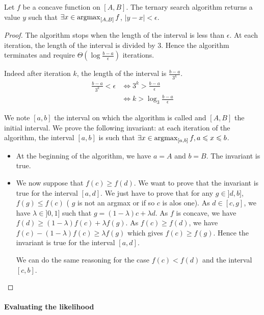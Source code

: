 \begin{thm}
    Let $f$ be a concave function on $[A, B]$. The ternary search algorithm returns a value $y$ such that $\exists x \in \operatorname*{argmax}_{[A, B]} f$, $|y - x| < \epsilon$.
\end{thm}
\begin{proof}
    The algorithm stops when the length of the interval is less than $\epsilon$. At each iteration, the length of the interval is divided by $3$. Hence the algorithm terminates and require $\Theta(\log \frac{b - a}{\epsilon})$ iterations.

    Indeed after iteration $k$, the length of the interval is $\frac{b - a}{3^k}$.
    \begin{align}
        \frac{b - a}{3^k} < \epsilon &\Leftrightarrow 3^k > \frac{b - a}{\epsilon} \\
        &\Leftrightarrow k > \log_3 \frac{b - a}{\epsilon}
    \end{align}

    We note $[a, b]$ the interval on which the algorithm is called and $[A, B]$ the initial interval.
    We prove the following invariant: at each iteration of the algorithm, the interval $[a, b]$ is such that $\exists x \in \operatorname*{argmax}_{[a, b]} f, a \leqslant x \leqslant b$.
    \begin{itemize}
        \item At the beginning of the algorithm, we have $a = A$ and $b = B$. The invariant is true.
        \item We now suppose that $f(c) \geq f(d)$. We want to prove that the invariant is true for the interval $[a, d]$. We just have to prove that for any $g \in ]d, b]$, $f(g) \leq f(c)$ ( $g$ is not an argmax or if so $c$ is alos one). As $d \in [c, g]$, we have $\lambda \in ]0, 1]$ such that $g = (1 - \lambda)c + \lambda d$. As $f$ is concave, we have $f(d) \geq (1 - \lambda)f(c) + \lambda f(g)$. As $f(c) \geq f(d)$, we have $f(c) - (1 - \lambda)f(c) \geq \lambda f(g)$ which gives $f(c) \geq f(g)$. Hence the invariant is true for the interval $[a, d]$.
        
        We can do the same reasoning for the case $f(c) < f(d)$ and the interval $[c, b]$.
    \end{itemize}
\end{proof}

\paragraph{Evaluating the likelihood}

